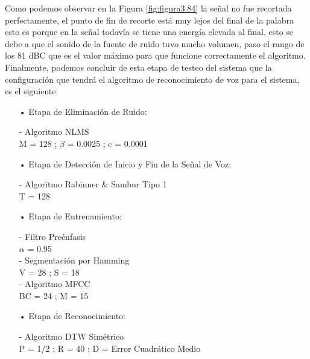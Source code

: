\vskip -0.5cm
Como podemos observar en la Figura \ref{fig:figura3.84} la señal no fue recortada perfectamente, el punto de fin de recorte está muy lejos del final de la palabra esto es porque en la señal todavía se tiene una energía elevada al final, esto se debe a que el sonido de la fuente de ruido tuvo mucho volumen, paso el rango de los 81 dBC que es el valor máximo para que funcione correctamente el algoritmo.
\vskip 0.5cm
Finalmente, podemos concluir de esta etapa de testeo del sistema que la configuración que tendrá el algoritmo de reconocimiento de voz para el sistema, es el siguiente:

\newpage
\begin{enumerate}

\item[•]Etapa de Eliminación de Ruido: 
\par
\hspace*{1cm} - Algoritmo NLMS \\
\hspace*{2cm} M = 128 ; \qquad $\beta$ = 0.0025 ; \qquad c = 0.0001

\item[•]Etapa de Detección de Inicio y Fin de la Señal de Voz: 
\par
\hspace*{1cm} - Algoritmo Rabinner \& Sambur Tipo 1 \\
\hspace*{2cm} T = 128

\item[•]Etapa de Entrenamiento: 
\par
\hspace*{1cm} - Filtro Preénfasis \\
\hspace*{2cm} $\alpha$ = 0.95 \\
\hspace*{1cm} - Segmentación por Hamming \\
\hspace*{2cm} V = 28 ; \qquad S = 18 \\
\hspace*{1cm} - Algoritmo MFCC \\
\hspace*{2cm} BC = 24 ; \qquad M = 15

\item[•]Etapa de Reconocimiento: 
\par
\hspace*{1cm} - Algoritmo DTW Simétrico \\
\hspace*{2cm} P = 1/2 ; \qquad R = 40 ; \qquad D = Error Cuadrático Medio \\

\end{enumerate}

